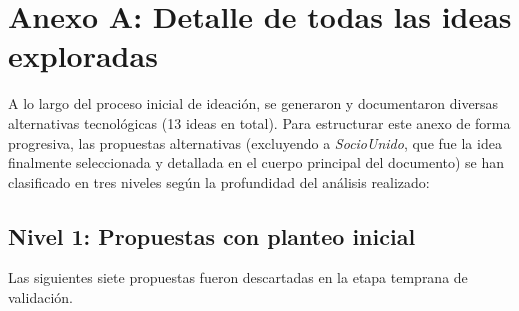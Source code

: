 \section{Anexo A: Detalle de todas las ideas exploradas}

A lo largo del proceso inicial de ideación, se generaron y documentaron diversas alternativas tecnológicas (13 ideas en total). Para estructurar este anexo de forma progresiva, las propuestas alternativas (excluyendo a \textit{SocioUnido}, que fue la idea finalmente seleccionada y detallada en el cuerpo principal del documento) se han clasificado en tres niveles según la profundidad del análisis realizado:

\subsection{Nivel 1: Propuestas con planteo inicial}

Las siguientes siete propuestas fueron descartadas en la etapa temprana de validación.

